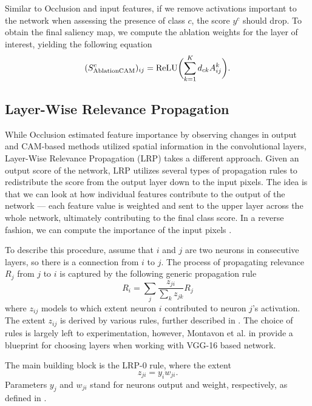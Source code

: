 Similar to Occlusion and input features, if we remove activations important to the network when assessing the presence of class $c$, the score $y^c$ should drop. To obtain the final saliency map, we compute the ablation weights for the layer of interest, yielding the following equation
\begin{equation}
    (S^c_{\text{AblationCAM}})_{ij} = \operatorname{ReLU} \biggl(\sum_{k=1}^K d_{ck} A^k_{ij}\biggr).
\end{equation}

\subsection{Layer-Wise Relevance Propagation}

While Occlusion estimated feature importance by observing changes in output and CAM-based methods utilized spatial information in the convolutional layers, Layer-Wise Relevance Propagation (LRP) \cite{lrp} takes a different approach.
Given an output score of the network, LRP utilizes several types of propagation rules to redistribute the score from the output layer down to the input pixels.
The idea is that we can look at how individual features contribute to the output of the network --- each feature value is weighted and sent to the upper layer across the whole network, ultimately contributing to the final class score.
In a reverse fashion, we can compute the importance of the input pixels \cite{lrp}.

To describe this procedure, assume that $i$ and $j$ are two neurons in consecutive layers, so there is a connection from $i$ to $j$. 
The process of propagating relevance $R_j$ from $j$ to $i$ is captured by the following generic propagation rule \cite{lrp}
\begin{equation}
    R_i = \sum_j \frac{z_{ji}}{\sum_k z_{jk}} R_j
\end{equation}
where $z_{ij}$ models to which extent neuron $i$ contributed to neuron $j$'s activation.
The extent $z_{ij}$ is derived by various rules, further described in \cite{lrp}.
The choice of rules is largely left to experimentation, however, Montavon et al. in \cite{lrp} provide a blueprint for choosing layers when working with VGG-16 based network.

The main building block is the LRP-$0$ rule, where the extent
\begin{equation}
    z_{ji} = y_i w_{ji}.
\end{equation}
Parameters $y_j$ and $w_{ji}$ stand for neurons output and weight, respectively, as defined in .

